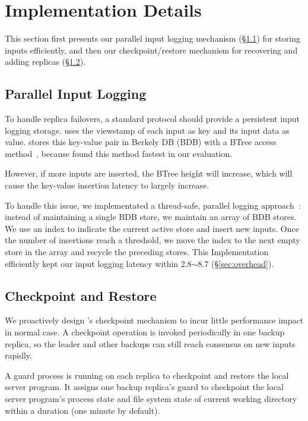 \section{Implementation Details} \label{sec:impl}

This section first presents our parallel input logging mechanism 
(\S\ref{sec:logging}) for storing inputs efficiently, and then our 
checkpoint/restore mechanism for recovering and adding replicas 
(\S\ref{sec:checkpoint}).

\subsection{Parallel Input Logging} \label{sec:logging}

To handle replica failovers, a standard \paxos protocol should provide a 
persistent input logging storage. \xxx uses the \paxos viewstamp of each input 
as key and its input data as value. \xxx stores this key-value pair in 
Berkely DB (BDB) with a BTree access method~\cite{berkeleydb}, because found 
this method fastest in our evaluation.

However, if more inputs are inserted, the BTree height 
will increase, which will cause the key-value insertion latency to 
largely increase.

To handle this issue, we implementated a thread-safe, 
parallel logging approach~\cite{para-log:atc10}: instead of maintaining a single 
BDB store, we maintain an array of BDB stores. We use an index to indicate 
the current active store and insert new inputs. Once the number of insertions 
reach a threshold, we move the index to the next empty store in the array and 
recycle the preceding stores. This Implementation efficiently kept our input 
logging latency within 2.8$\sim$8.7 \us (\S\ref{sec:overhead}).

\subsection{Checkpoint and Restore} \label{sec:checkpoint}

We proactively design \xxx's checkpoint mechanism to incur little performance 
impact in normal case. A checkpoint operation is invoked periodically 
in one backup replica, so the leader and other backups can still reach 
consensus on new inputs rapidly.

A guard process is running on each replica to checkpoint and restore the 
local server program. It assigns one backup 
replica's guard to checkpoint the local server program's process state and file 
system state of current working directory within a duration 
\tcheckpoint (one minute by default).

